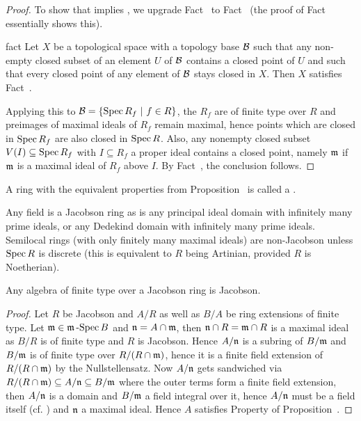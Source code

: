 \documentclass[a4paper,parskip=half,numbers=enddot, DIV=12]{scrreprt}
\begin{document}
\begin{proof}
    To show that  implies , we upgrade Fact~ to Fact~ (the proof of Fact~ essentially shows this).
    
    \begin{varthm}[++]{fact}
        Let $X$ be a topological space with a topology base $\mathcal{B}$ such that any non-empty closed subset of an element $U$ of $\mathcal{B}$ contains a closed point of $U$ and such that every closed point of any  element of $\mathcal{B}$ stays closed in $X$. Then $X$ satisfies Fact~.
    \end{varthm}
    
    Applying this to $\mathcal{B} = \left\{\operatorname{Spec} R_f \ \middle|\  f\in R\right\}$, the $R_f$ are of finite type over $R$ and preimages of maximal ideals of $R_f$ remain maximal, hence points which are closed in $\operatorname{Spec} R_f$ are also closed in $\operatorname{Spec} R$. Also, any nonempty closed subset $V(I)\subseteq \operatorname{Spec} R_f$ with $I\subseteq R_f$ a proper ideal contains a closed point, namely $\mathfrak{m}$ if $\mathfrak{m}$ is a maximal ideal of $R_f$ above $I$. By Fact~, the conclusion follows. 
\end{proof}
\begin{defi}
    A ring with the equivalent properties from Proposition~ is called a .
\end{defi}
\begin{example}
    Any field is a Jacobson ring as is any principal ideal domain with infinitely many prime ideals, or any Dedekind domain with infinitely many prime ideals. Semilocal rings (with only finitely many maximal ideals) are non-Jacobson unless $\operatorname{Spec} R$ is discrete (this is equivalent to $R$ being Artinian, provided $R$ is Noetherian).
\end{example}
\begin{cor}
    Any algebra of finite type over a Jacobson ring is Jacobson.
\end{cor}
\begin{proof}
    Let $R$ be Jacobson and $A/R$ as well as $B/A$ be ring extensions of finite type. Let $\mathfrak{m}\in \mathfrak{m}\operatorname{-Spec} B$ and $\mathfrak{n} = A\cap \mathfrak{m}$, then $\mathfrak{n}\cap R = \mathfrak{m}\cap R$ is a maximal ideal as $B/R$ is of finite type and $R$ is Jacobson. Hence $A/\mathfrak{n}$ is a subring of $B/\mathfrak{m}$ and $B/\mathfrak{m}$ is of finite type over $R/(R\cap\mathfrak{m})$, hence it is a finite field extension of $R/(R\cap\mathfrak{m})$ by the Nullstellensatz. Now $A/\mathfrak{n}$ gets sandwiched via $R/(R\cap\mathfrak{m}) \subseteq A/\mathfrak{n} \subseteq B/\mathfrak{m}$ where the outer terms form a finite field extension, then $A/\mathfrak{n}$ is a domain and $B/\mathfrak{m}$ a field integral over it, hence $A/\mathfrak{n}$ must be a field itself (cf. \cite[Proposition~1.5.1]{alg1}) and $\mathfrak{n}$ a maximal ideal. Hence $A$ satisfies Property  of Proposition~.
\end{proof}
\end{document}
